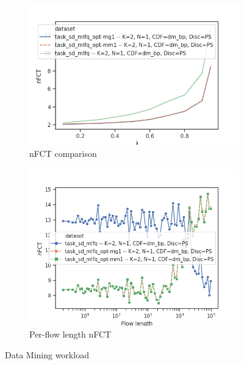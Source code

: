 \begin{figure}
	\centering
	\begin{subfigure}{.5\textwidth}
		\centering
		\includegraphics[width=1.05\textwidth]{Chapter3/Figures/dm_ps_comparison.png}
		\caption{nFCT comparison}
		\label{fig:optlbgain-dm}
	\end{subfigure}%
	\begin{subfigure}{.5\textwidth}
		\centering
		\includegraphics[width=\textwidth]{Chapter3/Figures/dm_ps_detailed.png}
		\caption{Per-flow length nFCT}
		\label{fig:optlbgainvsflowsize-dm}
	\end{subfigure}
	\caption{Data Mining workload}
	\label{fig:optlb-dm}
\end{figure}

